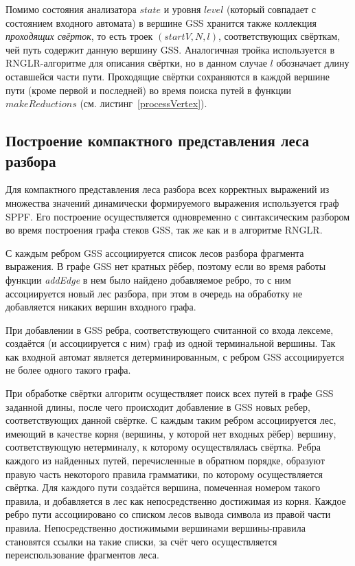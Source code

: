 Помимо состояния анализатора $state$ и уровня $level$ (который совпадает с состоянием входного автомата) в вершине GSS хранится также коллекция \emph{проходящих свёрток}, то есть троек $(startV, N, l)$, соответствующих свёрткам, чей путь содержит данную вершину GSS. Аналогичная тройка используется в RNGLR-алгоритме для описания свёртки, но в данном случае $l$ обозначает длину оставшейся части пути. Проходящие свёртки сохраняются в каждой вершине пути (кроме первой и последней) во время поиска путей в функции $makeReductions$ (см. листинг~\ref{processVertex}).


\subsection{Построение компактного представления леса разбора}

Для компактного представления леса разбора всех корректных выражений из множества значений динамически формируемого выражения используется граф SPPF. Его построение осуществляется одновременно с синтаксическим разбором во время построения графа стеков GSS, так же как и в алгоритме RNGLR.

С каждым ребром GSS ассоциируется список лесов разбора фрагмента выражения. В графе GSS нет кратных рёбер, поэтому если во время работы функции \emph{addEdge} в нем было найдено добавляемое ребро, то с ним ассоциируется новый лес разбора, при этом в очередь на обработку не добавляется никаких вершин входного графа.  

При добавлении в GSS ребра, соответствующего считанной со входа лексеме, создаётся (и ассоциируется с ним) граф из одной терминальной вершины. Так как входной автомат является детерминированным, с ребром GSS ассоциируется не более одного такого графа.

При обработке свёртки алгоритм осуществляет поиск всех путей в графе GSS заданной длины, после чего происходит добавление в GSS новых ребер, соответствующих данной свёртке. С каждым таким ребром ассоциируется лес, имеющий в качестве корня (вершины, у которой нет входных рёбер) вершину, соответствующую нетерминалу, к которому осуществлялась свёртка. Ребра каждого из найденных путей, перечисленные в обратном порядке, образуют правую часть некоторого правила грамматики, по которому осуществляется свёртка. Для каждого пути создаётся вершина, помеченная номером такого правила, и добавляется в лес как непосредственно достижимая из корня. Каждое ребро пути ассоциировано со списком лесов вывода символа из правой части правила. Непосредственно достижимыми вершинами вершины-правила становятся ссылки на такие списки, за счёт чего осуществляется переиспользование фрагментов леса.

